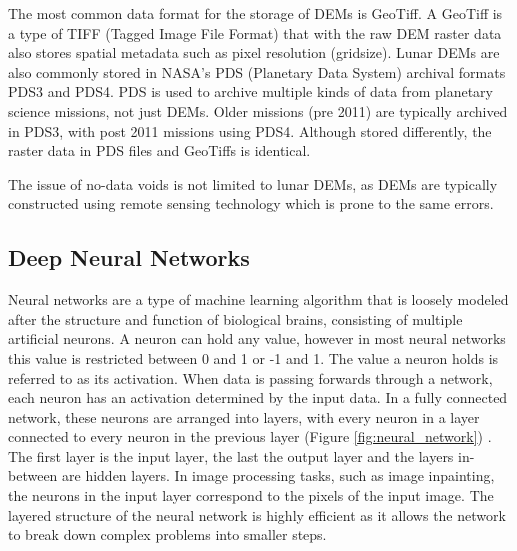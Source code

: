 \documentclass[twocolumn]{article}
\begin{document}
The most common data format for the storage of DEMs is GeoTiff.
A GeoTiff is a type of TIFF (Tagged Image File Format) that with the raw DEM raster data also stores spatial metadata such as pixel resolution (gridsize).
Lunar DEMs are also commonly stored in NASA's PDS (Planetary Data System) archival formats PDS3 and PDS4.
PDS is used to archive multiple kinds of data from planetary science missions, not just DEMs.
Older missions (pre 2011) are typically archived in PDS3, with post 2011 missions using PDS4.
Although stored differently, the raster data in PDS files and GeoTiffs is identical.

The issue of no-data voids is not limited to lunar DEMs, as DEMs are typically constructed using remote sensing technology which is prone to the same errors.

\subsection{Deep Neural Networks}
\label{sec:org3806a1c}

Neural networks are a type of machine learning algorithm that is loosely modeled after the structure and function of biological brains, consisting of multiple artificial neurons\autocite{grossiIntroductionArtificialNeural2008}.
A neuron can hold any value, however in most neural networks this value is restricted between 0 and 1 or -1 and 1.
The value a neuron holds is referred to as its activation.
When data is passing forwards through a network, each neuron has an activation determined by the input data.
In a fully connected network, these neurons are arranged into layers, with every neuron in a layer connected to every neuron in the previous layer (Figure \ref{fig:neural_network}) .
The first layer is the input layer, the last the output layer and the layers in-between are hidden layers.
In image processing tasks, such as image inpainting, the neurons in the input layer correspond to the pixels of the input image.
The layered structure of the neural network is highly efficient as it allows the network to break down complex problems into smaller steps.
\end{document}

